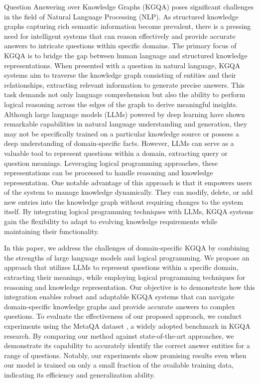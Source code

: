 \documentclass[11pt]{article}
\begin{document}
Question Answering over Knowledge Graphs (KGQA) poses significant challenges in the field of Natural Language Processing (NLP). As structured knowledge graphs capturing rich semantic information become prevalent, there is a pressing need for intelligent systems that can reason effectively and provide accurate answers to intricate questions within specific domains. The primary focus of KGQA is to bridge the gap between human language and structured knowledge representations. When presented with a question in natural language, KGQA systems aim to traverse the knowledge graph consisting of entities and their relationships, extracting relevant information to generate precise answers. This task demands not only language comprehension but also the ability to perform logical reasoning across the edges of the graph to derive meaningful insights. Although large language models (LLMs) powered by deep learning have shown remarkable capabilities in natural language understanding and generation, they may not be specifically trained on a particular knowledge source or possess a deep understanding of domain-specific facts. However, LLMs can serve as a valuable tool to represent questions within a domain, extracting query or question meanings. Leveraging logical programming approaches, these representations can be processed to handle reasoning and knowledge representation. One notable advantage of this approach is that it empowers users of the system to manage knowledge dynamically. They can modify, delete, or add new entries into the knowledge graph without requiring changes to the system itself. By integrating logical programming techniques with LLMs, KGQA systems gain the flexibility to adapt to evolving knowledge requirements while maintaining their functionality.

In this paper, we address the challenges of domain-specific KGQA by combining the strengths of large language models and logical programming. We propose an approach that utilizes LLMs to represent questions within a specific domain, extracting their meanings, while employing logical programming techniques for reasoning and knowledge representation. Our objective is to demonstrate how this integration enables robust and adaptable KGQA systems that can navigate domain-specific knowledge graphs and provide accurate answers to complex questions. To evaluate the effectiveness of our proposed approach, we conduct experiments using the MetaQA dataset \cite{zhang2017variational}, a widely adopted benchmark in KGQA research. By comparing our method against state-of-the-art approaches, we demonstrate its capability to accurately identify the correct answer entities for a range of questions. Notably, our experiments show promising results even when our model is trained on only a small fraction of the available training data, indicating its efficiency and generalization ability.
\end{document}
